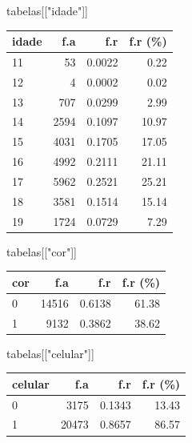 \documentclass[
]{article}
\newenvironment{Shaded}{\begin{snugshade}}{\end{snugshade}}
\newcommand{\NormalTok}[1]{\textcolor[rgb]{0.00,0.23,0.31}{#1}}
\newcommand{\StringTok}[1]{\textcolor[rgb]{0.13,0.47,0.30}{#1}}
\begin{document}
\begin{Shaded}
\begin{Highlighting}[]
\NormalTok{tabelas[[}\StringTok{"idade"}\NormalTok{]]}
\end{Highlighting}
\end{Shaded}

\begin{longtable}[]{@{}lrrr@{}}
\toprule()
idade & f.a & f.r & f.r (\%) \\
\midrule()
\endhead
11 & 53 & 0.0022 & 0.22 \\
12 & 4 & 0.0002 & 0.02 \\
13 & 707 & 0.0299 & 2.99 \\
14 & 2594 & 0.1097 & 10.97 \\
15 & 4031 & 0.1705 & 17.05 \\
16 & 4992 & 0.2111 & 21.11 \\
17 & 5962 & 0.2521 & 25.21 \\
18 & 3581 & 0.1514 & 15.14 \\
19 & 1724 & 0.0729 & 7.29 \\
\bottomrule()
\end{longtable}

\begin{Shaded}
\begin{Highlighting}[]
\NormalTok{tabelas[[}\StringTok{"cor"}\NormalTok{]]}
\end{Highlighting}
\end{Shaded}

\begin{longtable}[]{@{}lrrr@{}}
\toprule()
cor & f.a & f.r & f.r (\%) \\
\midrule()
\endhead
0 & 14516 & 0.6138 & 61.38 \\
1 & 9132 & 0.3862 & 38.62 \\
\bottomrule()
\end{longtable}

\begin{Shaded}
\begin{Highlighting}[]
\NormalTok{tabelas[[}\StringTok{"celular"}\NormalTok{]]}
\end{Highlighting}
\end{Shaded}

\begin{longtable}[]{@{}lrrr@{}}
\toprule()
celular & f.a & f.r & f.r (\%) \\
\midrule()
\endhead
0 & 3175 & 0.1343 & 13.43 \\
1 & 20473 & 0.8657 & 86.57 \\
\bottomrule()
\end{longtable}
\end{document}
